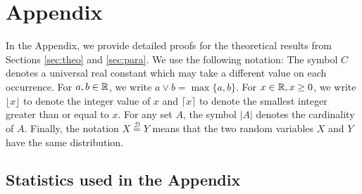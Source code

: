\newpage
\appendix
\section{Appendix}\label{appendix}
In the Appendix, we provide detailed proofs for the theoretical results from Sections \ref{sec:theo} and \ref{sec:para}. We use the following notation: The symbol $C$ denotes a universal real constant which may take a different value on each occurrence. For $a,b \in \mathbb{R}$, we write $a \vee b = \max\{a,b\}$. For $x \in \mathbb{R}, x \geq 0$, we write $\lfloor x \rfloor$ to denote the integer value of $x$ and $\lceil x \rceil$ to denote the smallest integer greater than or equal to $x$. For any set $A$, the symbol $|A|$ denotes the cardinality of $A$. Finally, the notation $X \stackrel{\mathcal{D}}{=} Y$ means that the two random variables $X$ and $Y$ have the same distribution. %


\subsection{Statistics used in the Appendix}\label{subsec:appendix:stats}

